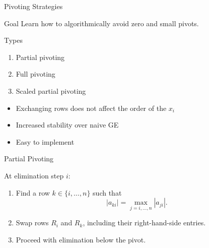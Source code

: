 \documentclass[10pt]{beamer}
\begin{document}
\begin{frame}{Pivoting Strategies}

\begin{block}{Goal}
Learn how to algorithmically avoid zero and small pivots.
\end{block}

\begin{block}{Types}
   \begin{enumerate}
       \item Partial pivoting
       \item Full pivoting
       \item Scaled partial pivoting
   \end{enumerate}
\end{block}

\bigskip


\begin{itemize}
    \item   Exchanging rows does not affect the order of the $x_i$
    \item   Increased stability over naive GE 
    \item   Easy to implement
\end{itemize}
\end{frame}
\begin{frame}{Partial Pivoting}

\begin{center}
\end{center}
At elimination step $i$:
\begin{enumerate}
    \item Find a row $k\in\{i,\ldots,n\}$ such that
    \[
        |a_{ki}|=\max_{j=i,\ldots,n}|a_{ji}|.
    \]
    \item Swap rows $R_i$ and $R_k$, including their right-hand-side entries.

    \item Proceed with elimination below the pivot.
\end{enumerate}
\end{frame}
\end{document}

